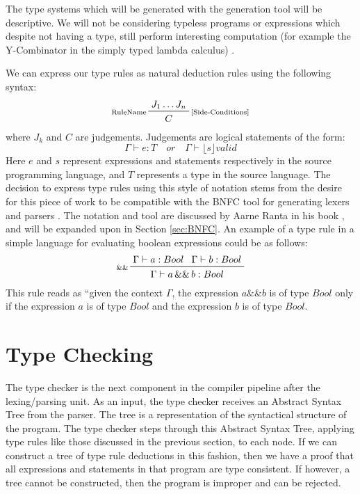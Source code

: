 \documentclass{UoYCSproject}
\begin{document}
The type systems which will be generated with the generation tool will be
descriptive. We will not be considering typeless programs or expressions which
despite not having a type, still perform interesting computation (for example
the Y-Combinator in the simply typed lambda calculus)\cite{NeilJones} \cite[p.~28]{SimonPeytonJones}
\cite[p.~155]{SimonPeytonJones}.

We can express our type rules as natural deduction rules using the following
syntax:
\begin{displaymath}
    \prftree[l,r]{\scriptsize [Side-Conditions]}{\scriptsize RuleName}{J_1 \dots J_n}{C}
\end{displaymath}
where $J_k$ and $C$ are judgements. Judgements are logical statements of the form:
\begin{displaymath}
    \Gamma \vdash e:T \quad or \quad \Gamma \vdash \lfloor s \rfloor valid
\end{displaymath}
Here $e$ and $s$ represent expressions and statements respectively in the source
programming language, and $T$ represents a type in the source language. The
decision to express type rules using this style of notation stems from the desire
for this piece of work to be compatible with the BNFC tool for generating lexers
and parsers \cite{BNFC}. The notation and tool are discussed by Aarne Ranta in
his book \cite{Ranta}, and will be expanded upon in Section \ref{sec:BNFC}. An example
of a type rule in a simple language for evaluating boolean expressions could be
as follows:
\begin{displaymath}
    \prftree[l]{\scriptsize \&\&}{\Gamma \vdash a:Bool}{\Gamma \vdash b:Bool}{\Gamma \vdash a \, \&\& \, b: Bool}
\end{displaymath}
This rule reads as ``given the context $\Gamma$, the expression $a \&\& b$
is of type $Bool$ only if the expression $a$ is of type $Bool$ and the expression $b$
is of type $Bool$.

\section{Type Checking}
\label{sec:Chap1TypeChecking}
The type checker is the next component in the compiler pipeline after the
lexing/parsing unit. As an input, the type checker receives an Abstract Syntax
Tree from the parser. The tree is a representation of the syntactical structure
of the program. The type checker steps through this Abstract Syntax Tree, applying
type rules like those discussed in the previous section, to each node. If we
can construct a tree of type rule deductions in this fashion, then we have a
proof that all expressions and statements in that program are type consistent.
If however, a tree cannot be constructed, then the program is improper and
can be rejected.
\end{document}
